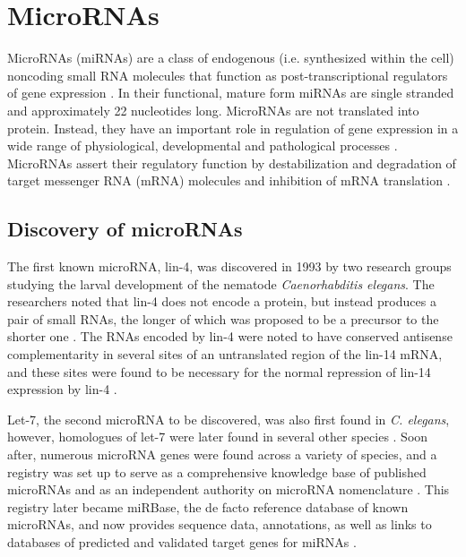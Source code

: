 
\section{MicroRNAs}\label{micrornas}

MicroRNAs (miRNAs) are a class of endogenous (i.e. synthesized within the
cell) noncoding small RNA molecules that function as post-transcriptional
regulators of gene expression \citep{Ambros2004}. In their
functional, mature form miRNAs are single stranded and approximately 22
nucleotides long. MicroRNAs are not translated into protein. Instead, they
have an important role in regulation of gene expression in a wide range of
physiological, developmental and pathological processes \citep{Bartel2009}.
MicroRNAs assert their regulatory function by destabilization and degradation
of target messenger RNA (mRNA) molecules and inhibition of mRNA translation
\citep{Fabian2010}.




\subsection{Discovery of microRNAs}

The first known microRNA, lin-4, was discovered in 1993 by two research groups
studying the larval development of the nematode \emph{Caenorhabditis elegans}.
The researchers noted that lin-4 does not encode a protein, but instead
produces a pair of small RNAs, the longer of which was proposed to be a
precursor to the shorter one \citep{Lee1993}. The RNAs encoded by lin-4 were
noted to have conserved antisense complementarity in several sites of an
untranslated region of the lin-14 mRNA, and these sites were found to be
necessary for the normal repression of lin-14 expression by lin-4
\citep{Lee1993,Wightman1993}.

Let-7, the second microRNA to be discovered, was also first found in \emph{C.
elegans}, however, homologues of let-7 were later found in several other
species \citep{Pasquinelli2000}. Soon after, numerous microRNA genes were found across
a variety of species, and a registry was set up to serve as a comprehensive
knowledge base of published microRNAs and as an independent authority on
microRNA nomenclature \citep{GriffithsJones2004}. This registry later became
miRBase, the de facto reference database of known microRNAs, and now provides
sequence data, annotations, as well as links to databases of predicted and
validated target genes for miRNAs \citep{Kozomara2014}.




